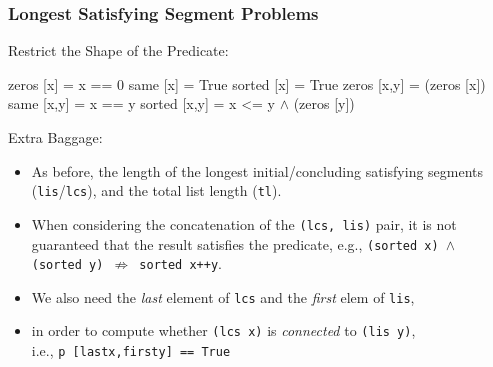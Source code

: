 \documentclass{beamer}
\newcommand{\emp}[1]{\textcolor{DikuRed}{ #1}}
\newcommand{\mymath}[1]{$ #1 $}
\begin{document}
\begin{frame}[fragile,t]
  \frametitle{Longest Satisfying Segment Problems}

\begin{block}{Restrict the Shape of the Predicate:}
\begin{colorcode}
zeros [x]   = x == 0           same [x]   = True     sorted [x]   = True
zeros [x,y] =  (zeros [x])     same [x,y] = x == y   sorted [x,y] = x <= y
             \mymath{\wedge} (zeros [y])
\end{colorcode}
\end{block} 

\bigskip
Extra Baggage:
\begin{itemize}
    \item As before, the \emp{length} of the longest initial/concluding  satisfying segments ({\tt lis}/{\tt lcs}),
            and the total list length ({\tt tl}).
    \item When considering the concatenation of the {\tt (lcs, lis)} pair, it is not guaranteed that the
            result satisfies the predicate, e.g., 
            {\tt (sorted x) $\wedge$ (sorted y) $\not\Rightarrow$ sorted x++y}. \pause  
    \item We also need the {\em last} element of {\tt lcs} and the {\em first} elem of {\tt lis},
    \item in order to compute whether {\tt (lcs x)} is {\em connected} to {\tt (lis y)}, \\ i.e., {\tt p [lastx,firsty] == True}
\end{itemize}
\end{frame}
\end{document}
